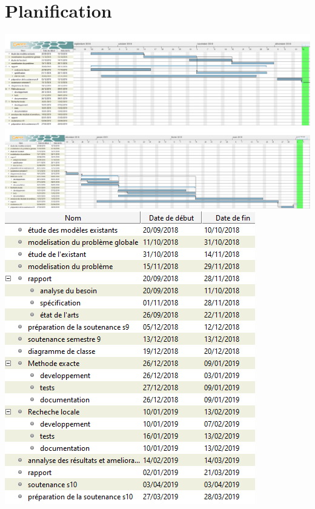 \chapter{Planification}

\includegraphics[width=\textwidth]{parts/planification/gantt}
\includegraphics[width=\textwidth]{parts/planification/gantt_2}
\includegraphics[width=\textwidth]{parts/planification/gantt_dates}